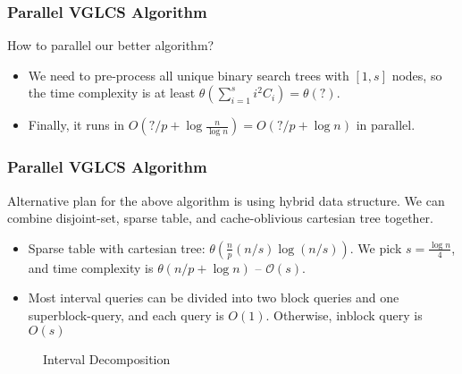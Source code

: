 \begin{frame}
	\frametitle{Parallel VGLCS Algorithm}
	How to parallel our better algorithm?
	\begin{itemize}
		\setlength\itemsep{1em}
		\item We need to pre-process all unique binary search trees with $[1, s]$ nodes,
			so the time complexity is at least $\theta(\sum_{i = 1}^{s} i^2 C_i) =  \theta(?)$.
		\item Finally, it runs in $O(?/p + \log \frac{n}{\log n}) = O(?/p + \log n)$ in parallel.
	\end{itemize}
\end{frame}

\begin{frame}
	\frametitle{Parallel VGLCS Algorithm}
	Alternative plan for the above algorithm is using hybrid data structure.
	We can combine disjoint-set, sparse table, and cache-oblivious cartesian tree together.
	\begin{itemize}
		\setlength\itemsep{1em}
		\item Sparse table with cartesian tree: $\mathcal{\theta}(\frac{n}{p} (n/s) \log (n/s))$.  
		We pick $s = \frac{\log n}{4}$, and time complexity is $\mathcal{\theta}(n/p + \log n)$ -- $\mathcal{O}(s)$.
		\item Most interval queries can be divided into two block queries
			and one superblock-query, and each query is $O(1)$. 
			Otherwise, inblock query is $O(s)$
	\end{itemize}
\end{frame}

\begin{frame}
    \begin{figure}[!thb]
      \centering
      \caption{Interval Decomposition}
      \label{fig:interval-decomposition}
    \end{figure}
\end{frame}

